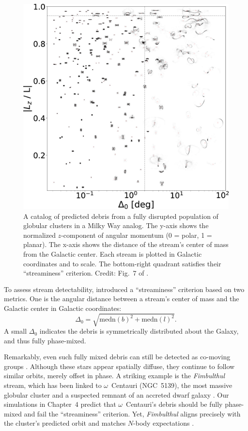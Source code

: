             \begin{figure}
                \includegraphics[width=\linewidth]{images/perason-2024-fig.jpg}
                \caption{A catalog of predicted debris from a fully disrupted population of globular clusters in a Milky Way analog. The y-axis shows the normalized $z$-component of angular momentum (0 = polar, 1 = planar). The x-axis shows the distance of the stream's center of mass from the Galactic center. Each stream is plotted in Galactic coordinates and to scale. The bottom-right quadrant satisfies their ``streaminess'' criterion. Credit: Fig.~7 of \citet{2024ApJ...976...54P}.}
                \label{fig:perason-2024-fig}
            \end{figure}

            To assess stream detectability, \citet{2024ApJ...976...54P} introduced a ``streaminess'' criterion based on two metrics. One is the angular distance between a stream's center of mass and the Galactic center in Galactic coordinates:
            \[
            \Delta_0 = \sqrt{\mathrm{medn}(b)^2 + \mathrm{medn}(l)^2}.
            \]
            A small $\Delta_0$ indicates the debris is symmetrically distributed about the Galaxy, and thus fully phase-mixed.

            Remarkably, even such fully mixed debris can still be detected as co-moving groups \citep{2018MNRAS.477.4063M,2018MNRAS.478.3862M}. Although these stars appear spatially diffuse, they continue to follow similar orbits, merely offset in phase. A striking example is the \textit{Fimbulthul} stream, which has been linked to $\omega$~Centauri (NGC~5139), the most massive globular cluster and a suspected remnant of an accreted dwarf galaxy \citep{2000LIACo..35..619M,2010ApJ...722.1373J}. Our simulations in Chapter~4 predict that $\omega$~Centauri’s debris should be fully phase-mixed and fail the ``streaminess'' criterion. Yet, \textit{Fimbulthul} aligns precisely with the cluster’s predicted orbit and matches $N$-body expectations \citep{2021ApJ...914..123I}.

